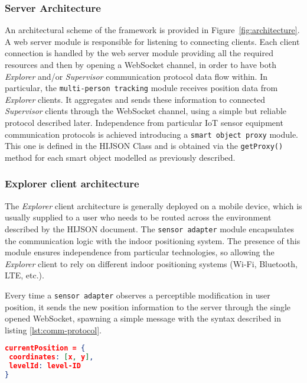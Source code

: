 \subsubsection{Server Architecture}\label{server-architecture}

An architectural scheme of the framework is provided in Figure~\ref{fig:architecture}. A web server module is responsible for listening to
connecting clients. Each client connection is handled by the web server module
providing all the required resources and then by opening a WebSocket channel, in order to
have both \emph{Explorer} and/or \emph{Supervisor} communication
protocol data flow within. In particular, the \texttt{multi-person\ tracking} module receives
position data from \emph{Explorer} clients. It aggregates and sends these
information to connected \emph{Supervisor} clients through the WebSocket
channel, using a simple but reliable protocol described later. Independence
from particular IoT sensor equipment communication protocols is achieved
introducing a \texttt{smart\ object\ proxy} module. This one is defined in the HIJSON Class
and is obtained via the {\tt getProxy()} method for each smart
object modelled as previously described.

\subsubsection{Explorer client architecture}\label{explorer-client-architecture}

The \emph{Explorer} client architecture is generally deployed on a mobile
device, which is usually supplied to a user who needs to be routed across the
environment described by the HIJSON document. The {\tt sensor\ adapter} module
encapsulates the communication logic with the indoor positioning system. The
presence of this module ensures independence from particular technologies, so
allowing the \emph{Explorer} client to rely on different indoor positioning
systems (Wi-Fi, Bluetooth, LTE, etc.).

Every time a {\tt sensor\ adapter} observes a perceptible
modification in user position, it sends the new position information to the
server through the single opened WebSocket, spawning a simple message with the
syntax described in listing \ref{lst:comm-protocol}.

\begin{lstlisting}[language=json, label={lst:comm-protocol}, captionpos=b,  caption=Example of message sent by the \emph{Explorer} client to the server.]
currentPosition = {
 coordinates: [x, y],
 levelId: level-ID 
}
\end{lstlisting}

